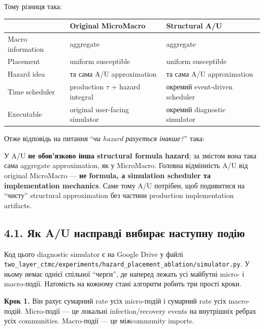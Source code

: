 \documentclass[11pt,a4paper]{article}
\begin{document}
Тому різниця така:

\begin{center}
\begin{tabular}{>{\raggedright\arraybackslash}p{42mm} >{\raggedright\arraybackslash}p{52mm} >{\raggedright\arraybackslash}p{52mm}}
\toprule
 & \textbf{Original MicroMacro} & \textbf{Structural A/U}\\
\midrule
Macro information & aggregate & aggregate\\
Placement & uniform susceptible & uniform susceptible\\
Hazard idea & та сама A/U approximation & та сама A/U approximation\\
Time scheduler & production $\tau$ + hazard integral & окремий event-driven scheduler\\
Executable & original user-facing simulator & окремий diagnostic simulator\\
\bottomrule
\end{tabular}
\end{center}

Отже відповідь на питання ``\textit{чи hazard рахується інакше?}'' така:

\begin{tcolorbox}[colback=soft,colframe=macro,title=Коротка відповідь]
У A/U \textbf{не обов'язково інша structural formula hazard}; за змістом вона така сама aggregate approximation, як у MicroMacro. Головна відмінність A/U від original MicroMacro --- \textbf{не formula, а simulation scheduler та implementation mechanics}. Саме тому A/U потрібен, щоб подивитися на ``чисту'' structural approximation без частини production implementation artifacts.
\end{tcolorbox}


\subsection*{4.1. Як A/U насправді вибирає наступну подію}

Код цього diagnostic simulator є на Google Drive у файлі
\texttt{two\_layer\_ctmc/experiments/hazard\_placement\_ablation/simulator.py}.
У ньому немає однієї спільної ``черги'', де наперед лежать усі майбутні micro- і macro-події. Натомість на кожному стані алгоритм робить три прості кроки.

\textbf{Крок 1.} Він рахує сумарний rate усіх micro-подій і сумарний rate усіх macro-подій.
Micro-події --- це локальні infection/recovery events на внутрішніх ребрах усіх communities. Macro-події --- це міжcommunity imports.
\end{document}

